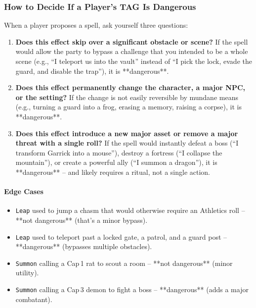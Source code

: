 \begin{tcolorbox}
\subsubsection*{How to Decide If a Player’s TAG Is Dangerous}
When a player proposes a spell, ask yourself three questions:

\begin{enumerate}
  \item \textbf{Does this effect skip over a significant obstacle or scene?}  
  If the spell would allow the party to bypass a challenge that you intended to be a whole scene (e.g., “I teleport us into the vault” instead of “I pick the lock, evade the guard, and disable the trap”), it is **dangerous**.

  \item \textbf{Does this effect permanently change the character, a major NPC, or the setting?}  
  If the change is not easily reversible by mundane means (e.g., turning a guard into a frog, erasing a memory, raising a corpse), it is **dangerous**.

  \item \textbf{Does this effect introduce a new major asset or remove a major threat with a single roll?}  
  If the spell would instantly defeat a boss (``I transform Garrick into a mouse''), destroy a fortress (``I collapse the mountain''), or create a powerful ally (``I summon a dragon''), it is **dangerous** – and likely requires a ritual, not a single action.
\end{enumerate}

\paragraph{Edge Cases}
\begin{itemize}
  \item \texttt{Leap} used to jump a chasm that would otherwise require an Athletics roll – **not dangerous** (that’s a minor bypass).  
  \item \texttt{Leap} used to teleport past a locked gate, a patrol, and a guard post – **dangerous** (bypasses multiple obstacles).  
  \item \texttt{Summon} calling a Cap 1 rat to scout a room – **not dangerous** (minor utility).  
  \item \texttt{Summon} calling a Cap 3 demon to fight a boss – **dangerous** (adds a major combatant).
\end{itemize}


\end{tcolorbox}
